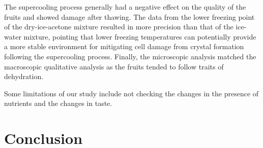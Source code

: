 \documentclass[12pt, a4paper]{article}
\begin{document}
The supercooling process generally had a negative effect on the quality
of the fruits and showed damage after thawing. The data from the lower
freezing point of the dry-ice-acetone mixture resulted in more precision
than that of the ice-water mixture, pointing that lower freezing
temperatures can potentially provide a more stable environment for
mitigating cell damage from crystal formation following the supercooling
process. Finally, the microscopic analysis matched the macroscopic
qualitative analysis as the fruits tended to follow traits of
dehydration.


Some limitations of our study include not checking the changes in the
presence of nutrients and the changes in taste.

\section{Conclusion}

\end{document}
